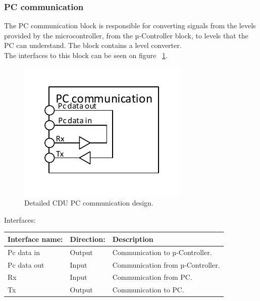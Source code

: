 \subsubsection{PC communication}
The PC communication block is responsible for converting signals from the levels provided by the microcontroller, from the µ-Controller block, to levels that the PC can understand. The block contains a level converter.\\
The interfaces to this block can be seen on figure ~\ref{fig:CDUPCC}.\\
\begin{figure}[H]
	\centering
	\includegraphics[scale=1]{billeder/CDUPCC}
	\caption{Detailed CDU PC communication design.}
	\label{fig:CDUPCC}
\end{figure}
Interfaces:
\begin{table}[H]
	\centering
	\begin{tabular}{|p{3cm} |p{3cm}| p{8cm}| }
		\hline
		Interface name: & Direction: 	& Description \\ \hline
		Pc data in		&Output & Communication to µ-Controller. \\\hline 
		Pc data out		&Input & Communication from µ-Controller. \\\hline
		Rx		&Input & Communication from PC. \\\hline 
		Tx		&Output & Communication to PC. \\\hline
	\end{tabular}
\end{table}



